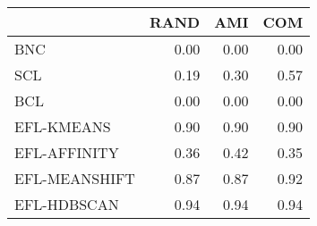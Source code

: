 \begin{tabular}{lrrr}
\toprule
 & RAND & AMI & COM \\
\midrule
BNC & 0.00 & 0.00 & 0.00 \\
SCL & 0.19 & 0.30 & 0.57 \\
BCL & 0.00 & 0.00 & 0.00 \\
EFL-KMEANS & 0.90 & 0.90 & 0.90 \\
EFL-AFFINITY & 0.36 & 0.42 & 0.35 \\
EFL-MEANSHIFT & 0.87 & 0.87 & 0.92 \\
EFL-HDBSCAN & 0.94 & 0.94 & 0.94 \\
\bottomrule
\end{tabular}
